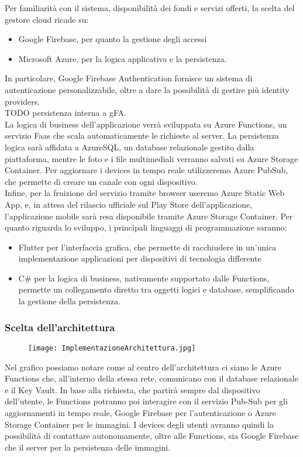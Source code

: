 Per familiarità con il sistema, disponibilità dei fondi e servizi offerti, 
la scelta del gestore cloud ricade su:
\begin{itemize}
    \item Google Firebase, per quanto la gestione degli accessi
    \item Microsoft Azure, per la logica applicativa e la persistenza.
\end{itemize}
In particolare, Google Firebase Authentication fornisce un sistema di autenticazione personalizzabile, 
oltre a dare la possibilità di gestire più identity providers.\\
TODO persistenza interna a gFA.\\
La logica di business dell'applicazione verrà sviluppata su Azure Functions, un servizio Faas che scala automaticamente le richieste al server.
La persistenza logica sarà affidata a AzureSQL, un database relazionale gestito dalla piattaforma, mentre le foto e i file multimediali verranno salvati su Azure Storage Container.
Per aggiornare i devices in tempo reale utilizzeremo Azure PubSub, che permette di creare un canale con ogni dispositivo.\\
Infine, per la fruizione del servizio tramite browser useremo Azure Static Web App, e, in attesa del rilascio ufficiale sul Play Store dell'applicazione, 
l'applicazione mobile sarà resa disponibile tramite Azure Storage Container.
\linebreak
Per quanto riguarda lo sviluppo, i principali linguaggi di programmazione saranno:
\begin{itemize}
    \item Flutter per l'interfaccia grafica, che permette di racchiudere in un'unica implementazione applicazioni per dispositivi di tecnologia differente
    \item C\# per la logica di business, nativamente supportato dalle Functions, permette un collegamento diretto tra oggetti logici e database, semplificando la gestione della persistenza.
\end{itemize}
\pagebreak

\subsubsection{Scelta dell'architettura}
\begin{figure}[h!]
    \begin{center}
        \texttt{[image: ImplementazioneArchitettura.jpg]}
    \end{center}
\end{figure}
Nel grafico possiamo notare come al centro dell'architettura ci siano le Azure Functions che, all'interno della stessa rete, comunicano con il database relazionale e il Key Vault.
In base alla richiesta, che partirà sempre dal dispositivo dell'utente, le Functions potranno poi interagire con 
il servizio Pub-Sub per gli aggiornamenti in tempo reale, 
Google Firebase per l'autenticazione o 
Azure Storage Container per le immagini.
I devices degli utenti avranno quindi la possibilità di contattare autonomamente, oltre alle Functions, sia Google Firebase che il server per la persistenza delle immagini. 
